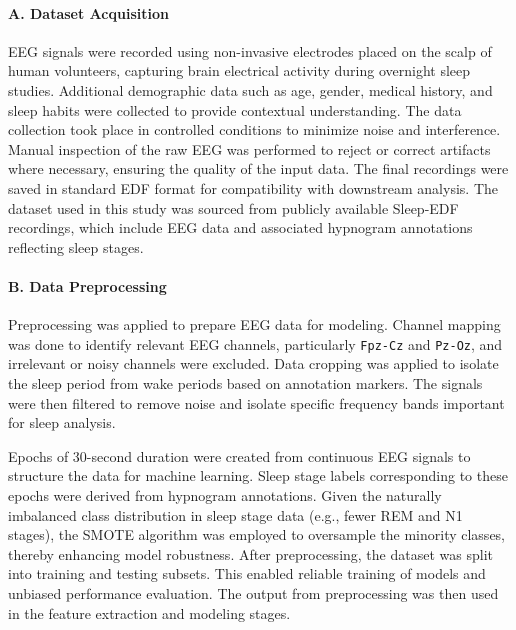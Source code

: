 \paragraph{A. Dataset Acquisition}

EEG signals were recorded using non-invasive electrodes placed on the scalp of human volunteers, capturing brain electrical activity during overnight sleep studies. Additional demographic data such as age, gender, medical history, and sleep habits were collected to provide contextual understanding. The data collection took place in controlled conditions to minimize noise and interference. Manual inspection of the raw EEG was performed to reject or correct artifacts where necessary, ensuring the quality of the input data. The final recordings were saved in standard EDF format for compatibility with downstream analysis. The dataset used in this study was sourced from publicly available Sleep-EDF recordings, which include EEG data and associated hypnogram annotations reflecting sleep stages.

\paragraph{B. Data Preprocessing}

Preprocessing was applied to prepare EEG data for modeling. Channel mapping was done to identify relevant EEG channels, particularly \texttt{Fpz-Cz} and \texttt{Pz-Oz}, and irrelevant or noisy channels were excluded. Data cropping was applied to isolate the sleep period from wake periods based on annotation markers. The signals were then filtered to remove noise and isolate specific frequency bands important for sleep analysis.

Epochs of 30-second duration were created from continuous EEG signals to structure the data for machine learning. Sleep stage labels corresponding to these epochs were derived from hypnogram annotations. Given the naturally imbalanced class distribution in sleep stage data (e.g., fewer REM and N1 stages), the SMOTE algorithm was employed to oversample the minority classes, thereby enhancing model robustness. After preprocessing, the dataset was split into training and testing subsets. This enabled reliable training of models and unbiased performance evaluation. The output from preprocessing was then used in the feature extraction and modeling stages.



 
  
	



